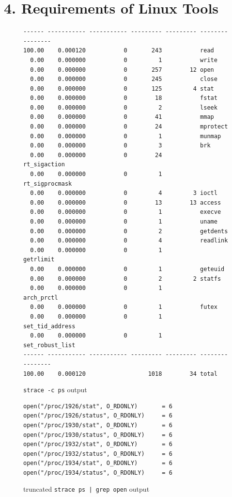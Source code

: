 \documentclass{proc}
\begin{document}
\section*{4. Requirements of Linux Tools}

 \begin{figure}[t]
\begin{lstlisting}[linewidth=\linewidth]
% time     seconds  usecs/call     calls    errors syscall
------ ----------- ----------- --------- --------- ----------------
100.00    0.000120           0       243           read
  0.00    0.000000           0         1           write
  0.00    0.000000           0       257        12 open
  0.00    0.000000           0       245           close
  0.00    0.000000           0       125         4 stat
  0.00    0.000000           0        18           fstat
  0.00    0.000000           0         2           lseek
  0.00    0.000000           0        41           mmap
  0.00    0.000000           0        24           mprotect
  0.00    0.000000           0         1           munmap
  0.00    0.000000           0         3           brk
  0.00    0.000000           0        24           rt_sigaction
  0.00    0.000000           0         1           rt_sigprocmask
  0.00    0.000000           0         4         3 ioctl
  0.00    0.000000           0        13        13 access
  0.00    0.000000           0         1           execve
  0.00    0.000000           0         1           uname
  0.00    0.000000           0         2           getdents
  0.00    0.000000           0         4           readlink
  0.00    0.000000           0         1           getrlimit
  0.00    0.000000           0         1           geteuid
  0.00    0.000000           0         2         2 statfs
  0.00    0.000000           0         1           arch_prctl
  0.00    0.000000           0         1           futex
  0.00    0.000000           0         1           set_tid_address
  0.00    0.000000           0         1           set_robust_list
------ ----------- ----------- --------- --------- ----------------
100.00    0.000120                  1018        34 total
 \end{lstlisting}
 \caption{\texttt{strace -c ps} output}
\end{figure}

 \begin{figure}[t]
\begin{lstlisting}[linewidth=\linewidth]
open("/proc/1926/stat", O_RDONLY)       = 6
open("/proc/1926/status", O_RDONLY)     = 6
open("/proc/1930/stat", O_RDONLY)       = 6
open("/proc/1930/status", O_RDONLY)     = 6
open("/proc/1932/stat", O_RDONLY)       = 6
open("/proc/1932/status", O_RDONLY)     = 6
open("/proc/1934/stat", O_RDONLY)       = 6
open("/proc/1934/status", O_RDONLY)     = 6
 \end{lstlisting}
 \caption{truncated \texttt{strace ps | grep open} output}
\end{figure}
\end{document}
